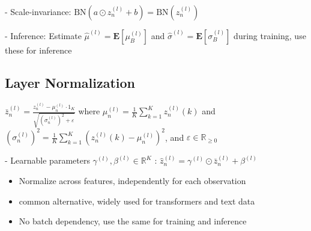 - Scale-invariance: 
$
\mathrm{BN}\left(a \odot z_{n}^{(l)}+b\right)=\mathrm{BN}\left(z_{n}^{(l)}\right) 
$

- Inference: Estimate $\hat{\mu}^{(l)}=\mathbf{E}\left[\mu_{B}^{(l)}\right]$ and $\hat{\sigma}^{(l)}=\mathbf{E}\left[\sigma_{B}^{(l)}\right]$ during training, use these for inference

\subsection*{Layer Normalization}
$
\bar{z}_{n}^{(l)}=\frac{z_{n}^{(l)}-\mu_{n}^{(l)} \cdot 1_{K}}{\sqrt{\left(\sigma_{n}^{(l)}\right)^{2}+\varepsilon}}
$
where $\mu_{n}^{(l)}=\frac{1}{K} \sum_{k=1}^{K} z_{n}^{(l)}(k)$ and $\left(\sigma_{n}^{(l)}\right)^{2}=\frac{1}{K} \sum_{k=1}^{K}\left(z_{n}^{(l)}(k)-\mu_{n}^{(l)}\right)^{2}$, and $\varepsilon \in \mathbb{R}_{\geq 0}$

- Learnable parameters $\gamma^{(l)}, \beta^{(l)} \in \mathbb{R}^{K}$ :
$
\hat{z}_{n}^{(l)}=\gamma^{(l)} \odot \bar{z}_{n}^{(l)}+\beta^{(l)}
$

\begin{itemize}
  \item Normalize across features, independently for each observation
  \item common alternative, widely used for transformers and text data
  \item No batch dependency, use the same for training and inference
\end{itemize}




